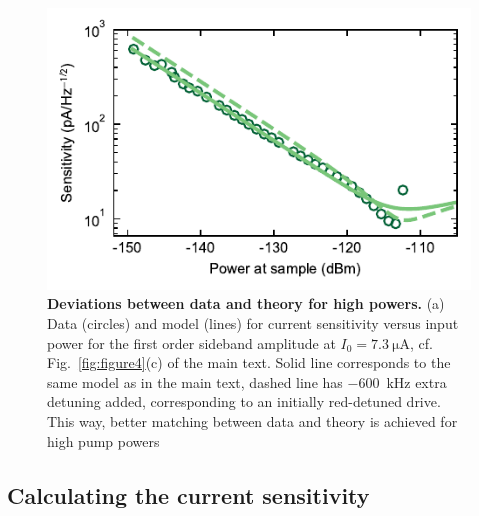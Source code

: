 \begin{figure}
	\centering
	\includegraphics[]{chapter-currentdetection/figures/SM_Pin_detuning}
	\caption{
		\textbf{Deviations between data and theory for high powers.}
		(a) Data (circles) and model (lines) for current sensitivity versus input power for the first order sideband amplitude at $I_0=\SI{7.3}{\micro\ampere}$, cf. Fig.~\ref{fig:figure4}(c) of the main text.
		Solid line corresponds to the same model as in the main text, dashed line has \SI{-600}{\kilo\hertz} extra detuning added, corresponding to an initially red-detuned drive.
		This way, better matching between data and theory is achieved for high pump powers
	}
	\label{fig:deviation_power}
\end{figure}


\subsection{Calculating the current sensitivity}\label{sec:analysis}

